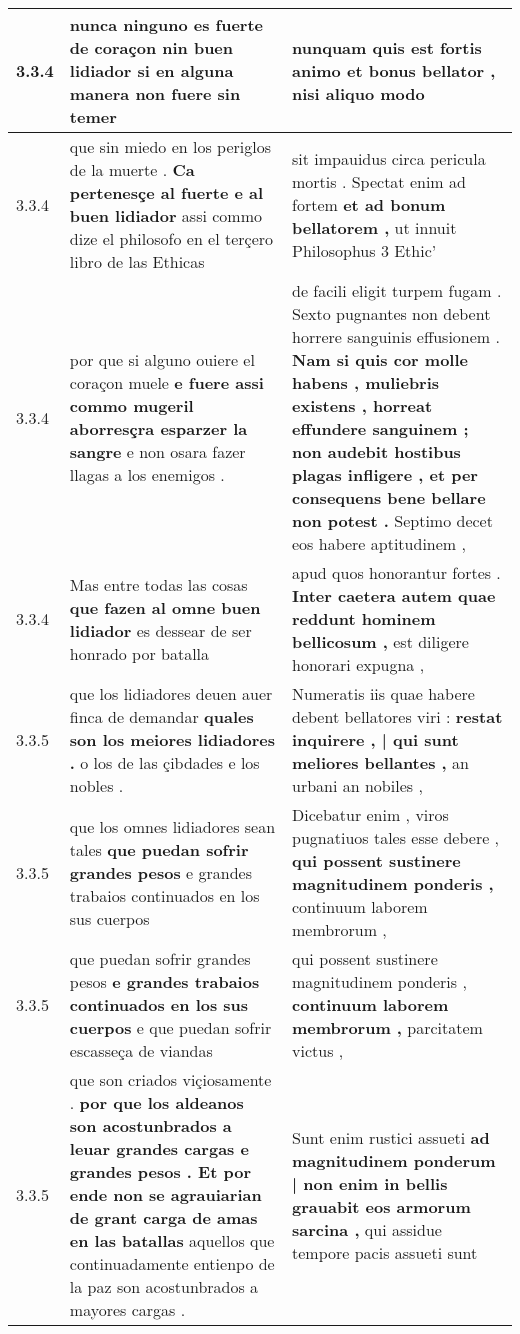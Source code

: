 \begin{tabular}{|p{1cm}|p{6.5cm}|p{6.5cm}|}
3.3.4 & nunca ninguno es fuerte de coraçon \textbf{ nin buen lidiador } si en alguna manera non fuere sin temer & nunquam quis est fortis animo \textbf{ et bonus bellator , } nisi aliquo modo \\\hline
3.3.4 & que sin miedo en los periglos de la muerte . \textbf{ Ca pertenesçe al fuerte e al buen lidiador } assi commo dize el philosofo en el terçero libro de las Ethicas & sit impauidus circa pericula mortis . Spectat enim ad fortem \textbf{ et ad bonum bellatorem , } ut innuit Philosophus 3 Ethic’ \\\hline
3.3.4 & por que si alguno ouiere el coraçon muele \textbf{ e fuere assi commo mugeril aborresçra esparzer la sangre } e non osara fazer llagas a los enemigos . & de facili eligit turpem fugam . Sexto pugnantes non debent horrere sanguinis effusionem . \textbf{ Nam si quis cor molle habens , muliebris existens , horreat effundere sanguinem ; non audebit hostibus plagas infligere , et per consequens bene bellare non potest . } Septimo decet eos habere aptitudinem , \\\hline
3.3.4 & Mas entre todas las cosas \textbf{ que fazen al omne buen lidiador } es dessear de ser honrado por batalla & apud quos honorantur fortes . \textbf{ Inter caetera autem quae reddunt hominem bellicosum , } est diligere honorari expugna , \\\hline
3.3.5 & que los lidiadores deuen auer finca de demandar \textbf{ quales son los meiores lidiadores . } o los de las çibdades e los nobles . & Numeratis iis quae habere debent bellatores viri : \textbf{ restat inquirere , | qui sunt meliores bellantes , } an urbani an nobiles , \\\hline
3.3.5 & que los omnes lidiadores sean tales \textbf{ que puedan sofrir grandes pesos } e grandes trabaios continuados en los sus cuerpos & Dicebatur enim , viros pugnatiuos tales esse debere , \textbf{ qui possent sustinere magnitudinem ponderis , } continuum laborem membrorum , \\\hline
3.3.5 & que puedan sofrir grandes pesos \textbf{ e grandes trabaios continuados en los sus cuerpos } e que puedan sofrir escasseça de viandas & qui possent sustinere magnitudinem ponderis , \textbf{ continuum laborem membrorum , } parcitatem victus , \\\hline
3.3.5 & que son criados viçiosamente . \textbf{ por que los aldeanos son acostunbrados a leuar grandes cargas e grandes pesos . Et por ende non se agrauiarian de grant carga de amas en las batallas } aquellos que continuadamente entienpo de la paz son acostunbrados a mayores cargas . & Sunt enim rustici assueti \textbf{ ad magnitudinem ponderum | non enim in bellis grauabit eos armorum sarcina , } qui assidue tempore pacis assueti sunt \\\hline

\end{tabular}
